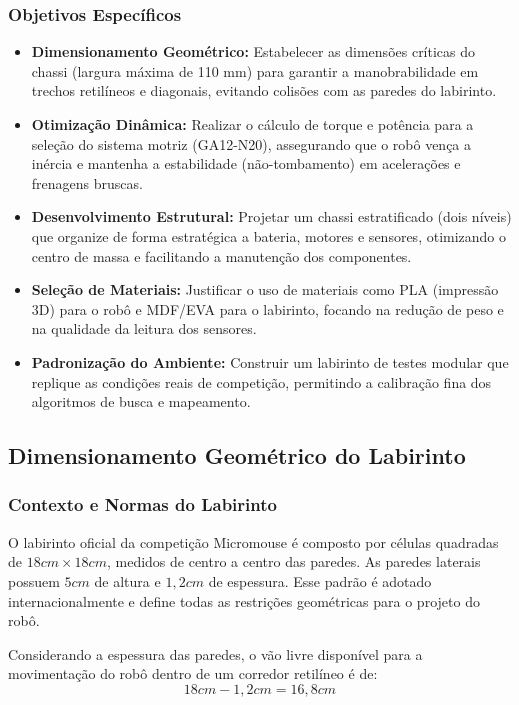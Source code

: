 \subsubsection{Objetivos Específicos}
\begin{itemize}
    \item \textbf{Dimensionamento Geométrico:} Estabelecer as dimensões críticas do chassi (largura máxima de 110 mm) para garantir a manobrabilidade em trechos retilíneos e diagonais, evitando colisões com as paredes do labirinto.
    \item \textbf{Otimização Dinâmica:} Realizar o cálculo de torque e potência para a seleção do sistema motriz (GA12-N20), assegurando que o robô vença a inércia e mantenha a estabilidade (não-tombamento) em acelerações e frenagens bruscas.
    \item \textbf{Desenvolvimento Estrutural:} Projetar um chassi estratificado (dois níveis) que organize de forma estratégica a bateria, motores e sensores, otimizando o centro de massa e facilitando a manutenção dos componentes.
    \item \textbf{Seleção de Materiais:} Justificar o uso de materiais como PLA (impressão 3D) para o robô e MDF/EVA para o labirinto, focando na redução de peso e na qualidade da leitura dos sensores.
    \item \textbf{Padronização do Ambiente:} Construir um labirinto de testes modular que replique as condições reais de competição, permitindo a calibração fina dos algoritmos de busca e mapeamento.
\end{itemize}

\subsection{Dimensionamento Geométrico do Labirinto}

\subsubsection{Contexto e Normas do Labirinto}
O labirinto oficial da competição Micromouse é composto por células quadradas de $18{ cm} \times 18{ cm}$, medidos de centro a centro das paredes. As paredes laterais possuem $5{ cm}$ de altura e $1,2{ cm}$ de espessura. Esse padrão é adotado internacionalmente e define todas as restrições geométricas para o projeto do robô.

Considerando a espessura das paredes, o vão livre disponível para a movimentação do robô dentro de um corredor retilíneo é de:
\begin{equation}
18{ cm} - 1,2{ cm} = 16,8{ cm}
\end{equation}

